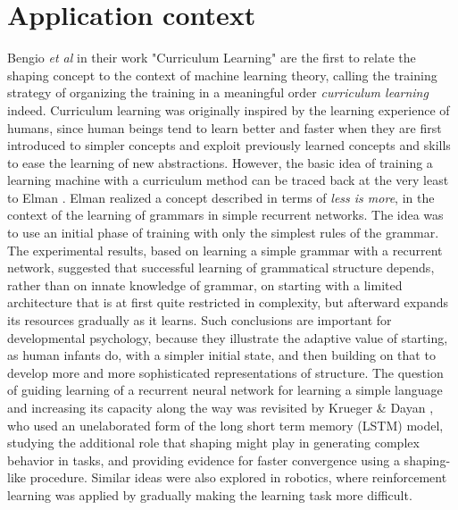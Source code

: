 \section{Application context}
Bengio \textit{et al} \cite{bengio2009curriculum} in their work "Curriculum Learning" are the first to relate the shaping concept
to the context of machine learning theory, calling the training strategy of organizing the training in a meaningful order \textit{curriculum learning} indeed.
Curriculum learning was originally inspired by the learning experience of humans, since human beings tend to learn better and faster when 
they are first introduced to simpler concepts and exploit previously learned concepts and skills to ease the learning of new abstractions.
However, the basic idea of training a learning machine with a curriculum method can be traced back
at the very least to Elman \cite{ELMAN199371}. Elman realized a concept described in terms of \textit{less is more}, in the context of the learning 
of grammars in simple recurrent networks. The idea was to use an initial phase of training with only the simplest rules of the grammar.
The experimental results, based on learning a simple grammar with a recurrent network, suggested that
successful learning of grammatical structure depends, rather than on innate knowledge of grammar,
on starting with a limited architecture that is at first quite restricted in complexity, but afterward expands its resources
gradually as it learns. Such conclusions are important for developmental psychology, because they 
illustrate the adaptive value of starting, as human infants do, with a simpler initial state, and then building on that to develop
more and more sophisticated representations of structure. The question of guiding learning of a recurrent neural network for learning
a simple language and increasing its capacity along the way was revisited by Krueger \& Dayan \cite{krueger2009},
who used an unelaborated form of the 
long short term memory (LSTM) model, studying
the additional role that shaping might play in generating complex behavior in tasks, and providing
evidence for faster convergence using a shaping-like procedure. Similar ideas were also explored
in robotics, where reinforcement learning was applied by gradually making the learning task more difficult.


